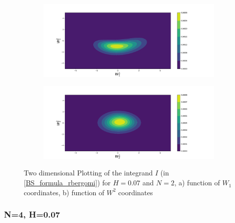 \documentclass[11pt]{article}
\begin{document}
 
 \begin{figure}[h!]
 	\centering
 	\begin{subfigure}{.4\textwidth}
 		\centering
 		\includegraphics[width=1\linewidth]{./figures/integrand_plotting_rBergomi/2D_plots/N_2/H_007/Bergomi_integrand_contours_K_1_H_007_W1_1_2_N_2}
 		\caption{}
 		\label{fig:sub3}
 	\end{subfigure}%
 	\begin{subfigure}{.4\textwidth}
 		\centering
 		\includegraphics[width=1\linewidth]{./figures/integrand_plotting_rBergomi/2D_plots/N_2/H_007/Bergomi_integrand_contours_K_1_H_007_W2_1_2_N_2}
 		\caption{}
 		\label{fig:sub4}
 	\end{subfigure}
 	\caption{Two dimensional Plotting of the integrand $I$ (in \eqref{BS_formula_rbergomi})  for $H=0.07$ and $N=2$, a)  function of $W_1$ coordinates, b) function of $W^2$ coordinates}
 	\label{fig:Integrand_H_007_N_2_2D}
 \end{figure}
 
 
 
 
 
 
 \newpage
 \subsubsection*{N=4, H=0.07}
 
\end{document}
